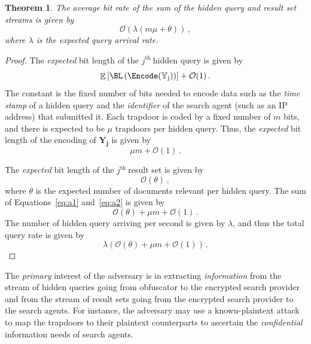 \documentclass[final,11pt]{article}
\newcommand{\rv}[1]{\mathrm{#1}}
\newcommand{\jth}{$j^{\text{th }}$}
\renewcommand{\vec}[1]{\boldsymbol{\mathbf{#1}}}
\DeclareMathOperator{\expectation}{\mathbb{E}}
\numberwithin{equation}{section}
\theoremstyle{plain}
\newtheorem{theorem}{Theorem}[section]
\theoremstyle{remark}
\begin{document}
\begin{theorem}
The average bit rate of the sum of the hidden query and result set streams is given by
\begin{equation}
    \mathcal{O}\left(\lambda(m \mu + \theta)\right)\,,
\end{equation}
where $\lambda$ is the \emph{expected} query arrival rate.
\end{theorem}
\begin{proof}
The \emph{expected} bit length of the \jth hidden query is given by
\begin{equation}
    \expectation\left[\BL\left(\Encode(\rv{\mathbb{Y}_j})\right)\right] + \mathcal{O}(1)\,.
\end{equation}
The constant is the fixed number of bits needed to encode data such as the \emph{time stamp} of a hidden query and the \emph{identifier} of the search agent (such as an IP address) that submitted it. Each trapdoor is coded by a fixed number of $m$ bits, and there is expected to be $\mu$ trapdoors per hidden query. Thus, the \emph{expected} bit length of the encoding of $\rv{\vec{Y_j}}$ is given by
\begin{equation}
\label{eq:a1}
    \mu m + \mathcal{O}(1)\,.
\end{equation}

The \emph{expected} bit length of the \jth result set is given by
\begin{equation}
\label{eq:a2}
    \mathcal{O}(\theta)\,,
\end{equation}
where $\theta$ is the expected number of documents relevant per hidden query. The sum of Equations~\ref{eq:a1} and~\ref{eq:a2} is given by
\begin{equation}
\label{eq:a3}
    \mathcal{O}(\theta) + \mu m + \mathcal{O}(1)\,.
\end{equation}
The number of hidden query arriving per second is given by $\lambda$, and thus the total query rate is given by
\begin{equation}
    \lambda \left(\mathcal{O}(\theta) + \mu m + \mathcal{O}(1)\right)\,.
\end{equation}
\end{proof}

The \emph{primary} interest of the adversary is in extracting \emph{information} from the stream of hidden queries going from obfuscator to the encrypted search provider and from the stream of result sets going from the encrypted search provider to the search agents. For instance, the adversary may use a known-plaintext attack to map the trapdoors to their plaintext counterparts to ascertain the \emph{confidential} information needs of search agents.
\end{document}
